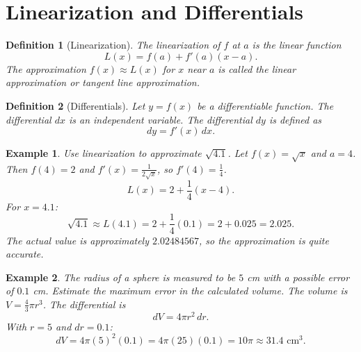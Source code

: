 \documentclass[11pt,a4paper]{article}
\newtheorem{example}{Example}
\newtheorem{definition}{Definition}
\begin{document}
\section{Linearization and Differentials}
\begin{definition}[Linearization]
The \textit{linearization} of $f$ at $a$ is the linear function
\[
L(x) = f(a) + f'(a)(x - a).
\]
The approximation $f(x) \approx L(x)$ for $x$ near $a$ is called the \textit{linear approximation} or \textit{tangent line approximation}.
\end{definition}
\begin{definition}[Differentials]
Let $y = f(x)$ be a differentiable function. The \textit{differential} $dx$ is an independent variable. The \textit{differential} $dy$ is defined as
\[
dy = f'(x) \, dx.
\]
\end{definition}
\begin{example}
Use linearization to approximate $\sqrt{4.1}$.
Let $f(x) = \sqrt{x}$ and $a = 4$. Then $f(4) = 2$ and $f'(x) = \frac{1}{2\sqrt{x}}$, so $f'(4) = \frac{1}{4}$.
\[
L(x) = 2 + \frac{1}{4}(x - 4).
\]
For $x = 4.1$:
\[
\sqrt{4.1} \approx L(4.1) = 2 + \frac{1}{4}(0.1) = 2 + 0.025 = 2.025.
\]
The actual value is approximately $2.02484567$, so the approximation is quite accurate.
\end{example}
\begin{example}
The radius of a sphere is measured to be $5$ cm with a possible error of $0.1$ cm. Estimate the maximum error in the calculated volume.
The volume is $V = \frac{4}{3}\pi r^3$. The differential is
\[
dV = 4\pi r^2 \, dr.
\]
With $r = 5$ and $dr = 0.1$:
\[
dV = 4\pi (5)^2 (0.1) = 4\pi (25)(0.1) = 10\pi \approx 31.4 \text{ cm}^3.
\]
\end{example}
\end{document}

